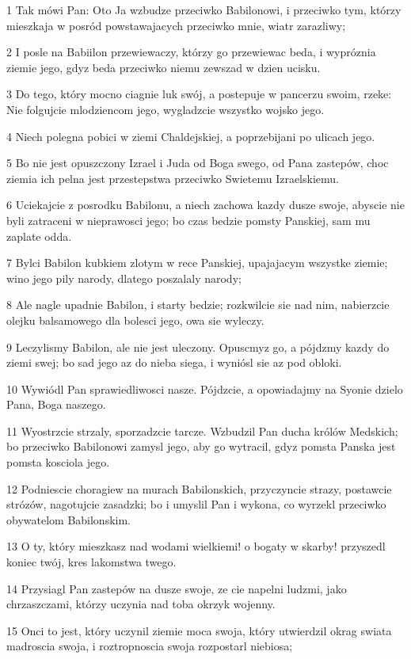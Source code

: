 \par 1 Tak mówi Pan: Oto Ja wzbudze przeciwko Babilonowi, i przeciwko tym, którzy mieszkaja w posród powstawajacych przeciwko mnie, wiatr zarazliwy;
\par 2 I posle na Babiilon przewiewaczy, którzy go przewiewac beda, i wypróznia ziemie jego, gdyz beda przeciwko niemu zewszad w dzien ucisku.
\par 3 Do tego, który mocno ciagnie luk swój, a postepuje w pancerzu swoim, rzeke: Nie folgujcie mlodziencom jego, wygladzcie wszystko wojsko jego.
\par 4 Niech polegna pobici w ziemi Chaldejskiej, a poprzebijani po ulicach jego.
\par 5 Bo nie jest opuszczony Izrael i Juda od Boga swego, od Pana zastepów, choc ziemia ich pelna jest przestepstwa przeciwko Swietemu Izraelskiemu.
\par 6 Uciekajcie z posrodku Babilonu, a niech zachowa kazdy dusze swoje, abyscie nie byli zatraceni w nieprawosci jego; bo czas bedzie pomsty Panskiej, sam mu zaplate odda.
\par 7 Bylci Babilon kubkiem zlotym w rece Panskiej, upajajacym wszystke ziemie; wino jego pily narody, dlatego poszalaly narody;
\par 8 Ale nagle upadnie Babilon, i starty bedzie; rozkwilcie sie nad nim, nabierzcie olejku balsamowego dla bolesci jego, owa sie wyleczy.
\par 9 Leczylismy Babilon, ale nie jest uleczony. Opuscmyz go, a pójdzmy kazdy do ziemi swej; bo sad jego az do nieba siega, i wyniósl sie az pod obloki.
\par 10 Wywiódl Pan sprawiedliwosci nasze. Pójdzcie, a opowiadajmy na Syonie dzielo Pana, Boga naszego.
\par 11 Wyostrzcie strzaly, sporzadzcie tarcze. Wzbudzil Pan ducha królów Medskich; bo przeciwko Babilonowi zamysl jego, aby go wytracil, gdyz pomsta Panska jest pomsta kosciola jego.
\par 12 Podniescie choragiew na murach Babilonskich, przyczyncie strazy, postawcie strózów, nagotujcie zasadzki; bo i umyslil Pan i wykona, co wyrzekl przeciwko obywatelom Babilonskim.
\par 13 O ty, który mieszkasz nad wodami wielkiemi! o bogaty w skarby! przyszedl koniec twój, kres lakomstwa twego.
\par 14 Przysiagl Pan zastepów na dusze swoje, ze cie napelni ludzmi, jako chrzaszczami, którzy uczynia nad toba okrzyk wojenny.
\par 15 Onci to jest, który uczynil ziemie moca swoja, który utwierdzil okrag swiata madroscia swoja, i roztropnoscia swoja rozpostarl niebiosa;
